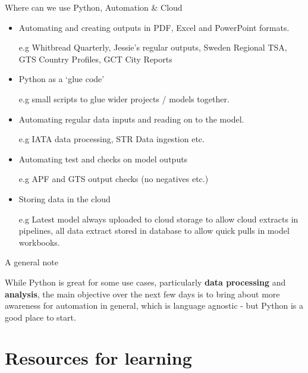 \documentclass[aspectratio=169]{beamer}
\begin{document}
\begin{frame}{Where can we use Python, Automation \& Cloud}

\begin{itemize}
\item Automating and creating outputs in PDF, Excel and PowerPoint formats.

 		{\small e.g Whitbread Quarterly, Jessie's regular outputs, Sweden Regional TSA, GTS Country Profiles, GCT City Reports}
 		
\item Python as a `glue code'

	{\small e.g small scripts to glue wider projects / models together.}
 		
 \item {Automating regular data inputs and reading on to the model.} 
 
 		{\small e.g IATA data processing, STR Data ingestion etc.}
 		
 \item{Automating test and checks on model outputs}
 
	 {\small e.g APF and GTS output checks (no negatives etc.)}
	 
	 
 \item{Storing data in the cloud}
 
	 {\small e.g Latest model always uploaded to cloud storage to allow cloud extracts in pipelines, all data extract stored in database to allow quick pulls in model workbooks.}
 		
\end{itemize}
\end{frame}

\begin{frame}{A general note}

{\Large While Python is great for some use cases, particularly \textbf{data processing} and \textbf{analysis}, the main objective over the next few days is to bring about more awareness for automation in general, which is language agnostic - but Python is a good place to start.}
	
\end{frame}



\section{Resources for learning}
\end{document}
